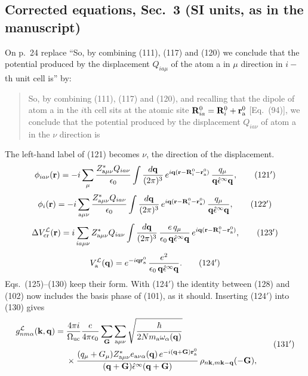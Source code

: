 \documentclass[11pt]{article}
\begin{document}
\subsection{Corrected equations, Sec.~3 (SI units, as in the manuscript)}\label{sec:phase-3}
On p.~24 replace ``So, by combining (111), (117) and (120) we conclude that the potential produced by
the displacement $Q_{ia\mu}$ of the atom a in $\mu$ direction in $i-$th unit cell is'' by:
\begin{quote}
So, by combining (111), (117) and (120), and recalling that the dipole of atom a in the $i$th cell sits at
the atomic site $\mathbf R^0_{ia}=\mathbf R^0_i+\mathbf r^0_{\rm a}$ [Eq.~(94)], we conclude that the potential
produced by the displacement $Q_{ia\nu}$ of atom a in the $\nu$ direction is
\end{quote}
The left-hand label of (121) becomes $\nu$, the direction of the displacement.
\begin{equation*}
\phi_{ia\nu}(\mathbf r)=-i\sum_\mu\frac{Z^*_{{\rm a}\mu\nu}Q_{ia\nu}}{\epsilon_0}\int\frac{d\mathbf q}{(2\pi)^3}\,
e^{i\mathbf q(\mathbf r-\mathbf R^0_i-\mathbf r^0_{\rm a})}\,\frac{q_\mu}{\mathbf q\hat\epsilon^\infty\mathbf q},\tag{121$'$}
\end{equation*}
\begin{equation*}
\phi_i(\mathbf r)=-i\sum_{{\rm a}\mu\nu}\frac{Z^*_{{\rm a}\mu\nu}Q_{ia\nu}}{\epsilon_0}\int\frac{d\mathbf q}{(2\pi)^3}\,
e^{i\mathbf q(\mathbf r-\mathbf R^0_i-\mathbf r^0_{\rm a})}\,\frac{q_\mu}{\mathbf q\hat\epsilon^\infty\mathbf q},\tag{122$'$}
\end{equation*}
\begin{equation*}
\Delta V^{\mathcal L}_{\rm cr}(\mathbf r)=i\sum_{ia\mu\nu}Z^*_{{\rm a}\mu\nu}Q_{ia\nu}\int\frac{d\mathbf q}{(2\pi)^3}\,
\frac{e\,q_\mu}{\epsilon_0\,\mathbf q\hat\epsilon^\infty\mathbf q}\,e^{i\mathbf q(\mathbf r-\mathbf R^0_i-\mathbf r^0_{\rm a})},\tag{123$'$}
\end{equation*}
\begin{equation*}
V^{\mathcal L}_{\rm a}(\mathbf q)=e^{-i\mathbf q\mathbf r^0_{\rm a}}\,\frac{e^2}{\epsilon_0\,\mathbf q\hat\epsilon^\infty\mathbf q}.\tag{124$'$}
\end{equation*}
Eqs.~(125)--(130) keep their form. With (124$'$) the identity between (128) and (102) now includes the
basis phase of (101), as it should. Inserting (124$'$) into (130) gives
\begin{equation*}
\begin{split}
g^{\mathcal L}_{nm\alpha}(\mathbf k,\mathbf q)={}&\frac{4\pi i}{\Omega_{\rm uc}}\frac{e}{4\pi\epsilon_0}
\sum_{\mathbf G}\sum_{{\rm a}\mu\nu}\sqrt{\frac{\hbar}{2Nm_{\rm a}\omega_\alpha(\mathbf q)}}\\
&\times\frac{(q_\mu+G_\mu)Z^*_{{\rm a}\mu\nu}e_{{\rm a}\nu\alpha}(\mathbf q)\,e^{-i(\mathbf q+\mathbf G)\mathbf r^0_{\rm a}}}
{(\mathbf q+\mathbf G)\hat\epsilon^\infty(\mathbf q+\mathbf G)}\,\rho_{n\mathbf k,m\mathbf k-\mathbf q}(-\mathbf G),
\end{split}
\tag{131$'$}
\end{equation*}
\end{document}

